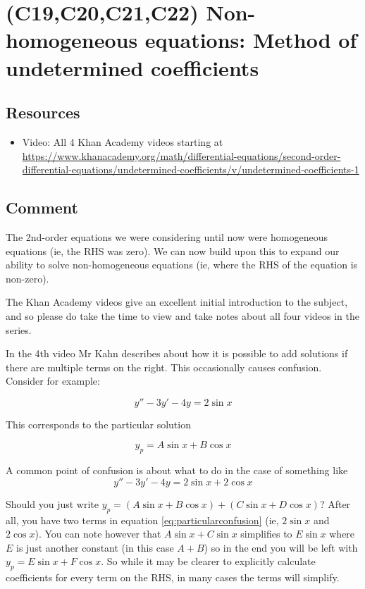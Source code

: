 \newpage
\section{(C19,C20,C21,C22) Non-homogeneous equations: Method of undetermined coefficients}

\subsection*{Resources}
\begin{itemize}
    \item Video: All 4 Khan Academy videos starting at \url{https://www.khanacademy.org/math/differential-equations/second-order-differential-equations/undetermined-coefficients/v/undetermined-coefficients-1}
\end{itemize}

\subsection*{Comment}
The 2nd-order equations we were considering until now were homogeneous equations (ie, the RHS was zero). We can now build upon this to expand our ability to solve non-homogeneous equations (ie, where the RHS of the equation is non-zero).

The Khan Academy videos give an excellent initial introduction to the subject, and so please do take the time to view and take notes about all four videos in the series.

In the 4th video Mr Kahn describes about how it is possible to add solutions if there are multiple terms on the right. This occasionally causes confusion. Consider for example:

\begin{equation}
    y'' - 3y' - 4y = 2 \sin x
\end{equation}

This corresponds to the particular solution

\begin{equation}
    y_p = A \sin x + B \cos x
\end{equation}

A common point of confusion is about what to do in the case of something like
\begin{equation}
    \label{eq:particularconfusion}
    y'' - 3y' - 4y = 2 \sin x + 2 \cos x
\end{equation}

Should you just write $y_p = (A \sin x + B \cos x) + (C \sin x + D \cos x)$? After all, you have two terms in equation \ref{eq:particularconfusion} (ie, $2 \sin x$ and $2 \cos x$). You can note however that $A \sin x + C \sin x$ simplifies to $E \sin x$ where $E$ is just another constant (in this case $A+B$) so in the end you will be left with $y_p = E \sin x + F \cos x$. So while it may be clearer to explicitly calculate coefficients for every term on the RHS, in many cases the terms will simplify.


